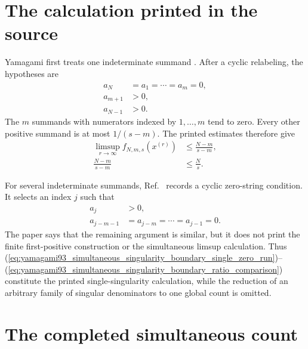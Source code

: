 \documentclass[11pt]{article}
\begin{document}
\section{The calculation printed in the source}

Yamagami first treats one indeterminate summand
\cite[p.~525]{Yamagami1993Cyclic}. After a cyclic relabeling, the hypotheses
are
\begin{align}
    a_N
        &= a_1
         = \cdots
         = a_m
         = 0,
    \label{eq:yamagami93_simultaneous_singularity_boundary_single_zero_run}\\
    a_{m+1}
        &> 0,
    \label{eq:yamagami93_simultaneous_singularity_boundary_single_right_positive}\\
    a_{N-1}
        &> 0.
    \label{eq:yamagami93_simultaneous_singularity_boundary_single_left_positive}
\end{align}
The $m$ summands with numerators indexed by $1,\ldots,m$ tend to zero. Every
other positive summand is at most $1/(s-m)$. The printed estimates therefore
give
\begin{align}
    \limsup_{r\to\infty} f_{N,m,s}(x^{(r)})
        &\leq \frac{N-m}{s-m},
    \label{eq:yamagami93_simultaneous_singularity_boundary_single_limsup}\\
    \frac{N-m}{s-m}
        &\leq \frac{N}{s}.
    \label{eq:yamagami93_simultaneous_singularity_boundary_ratio_comparison}
\end{align}

For several indeterminate summands, Ref.~\cite{Yamagami1993Cyclic} records a
cyclic zero-string condition. It selects an index $j$ such that
\begin{align}
    a_j
        &> 0,
    \label{eq:yamagami93_simultaneous_singularity_boundary_run_endpoint}\\
    a_{j-m-1}
        &= a_{j-m}
         = \cdots
         = a_{j-1}
         = 0.
    \label{eq:yamagami93_simultaneous_singularity_boundary_singular_run}
\end{align}
The paper says that the remaining argument is similar, but it does not print
the finite first-positive construction or the simultaneous limsup
calculation. Thus
(\ref{eq:yamagami93_simultaneous_singularity_boundary_single_zero_run})--%
(\ref{eq:yamagami93_simultaneous_singularity_boundary_ratio_comparison})
constitute the printed single-singularity calculation, while the reduction of
an arbitrary family of singular denominators to one global count is omitted.

\section{The completed simultaneous count}
\end{document}
